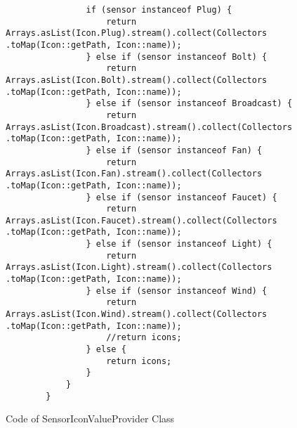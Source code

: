\begin{longlisting}
\begin{verbatim}
				if (sensor instanceof Plug) {
					return Arrays.asList(Icon.Plug).stream().collect(Collectors .toMap(Icon::getPath, Icon::name));
				} else if (sensor instanceof Bolt) { 
					return Arrays.asList(Icon.Bolt).stream().collect(Collectors .toMap(Icon::getPath, Icon::name));
				} else if (sensor instanceof Broadcast) { 
					return Arrays.asList(Icon.Broadcast).stream().collect(Collectors .toMap(Icon::getPath, Icon::name));
				} else if (sensor instanceof Fan) { 
					return Arrays.asList(Icon.Fan).stream().collect(Collectors .toMap(Icon::getPath, Icon::name));
				} else if (sensor instanceof Faucet) { 
					return Arrays.asList(Icon.Faucet).stream().collect(Collectors .toMap(Icon::getPath, Icon::name));
				} else if (sensor instanceof Light) { 
					return Arrays.asList(Icon.Light).stream().collect(Collectors .toMap(Icon::getPath, Icon::name));
				} else if (sensor instanceof Wind) { 
					return Arrays.asList(Icon.Wind).stream().collect(Collectors .toMap(Icon::getPath, Icon::name));
					//return icons;
				} else {
					return icons;
				}
			}
		}
	\end{verbatim}
	\caption{Code of SensorIconValueProvider Class}
	\label{lst:classSensorIconValueProvider}
\end{longlisting}

